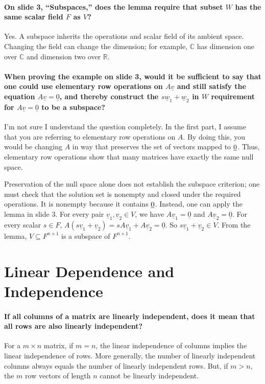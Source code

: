 \documentclass[10pt,english]{article}
\begin{document}
\paragraph{On slide 3, ``Subspaces,'' does the lemma require that subset $W$ has the same scalar field $F$ as $V$?}
Yes. A subspace inherits the operations and scalar field of its ambient space. Changing the field can change the dimension; for example, $\mathbb{C}$ has dimension one over $\mathbb{C}$ and dimension two over $\mathbb{R}$.


\paragraph{When proving the example on slide 3, would it be sufficient to say that one could use elementary row operations on $A\underline{v}$ and still satisfy the equation $A\underline{v}=\underline{0}$, and thereby construct the $s\underline{w}_1 + \underline{w}_2$ in $W$ requirement for $A\underline{v}=\underline{0}$ to be a subspace?}
I'm not sure I understand the question completely.
In the first part, I assume that you are referring to elementary row operations on $A$.
By doing this, you would be changing $A$ in way that preserves the set of vectors mapped to $\underline{0}$.
Thus, elementary row operations  show that many matrices have exactly the same null space.

Preservation of the null space alone does not establish the subspace criterion; one must check that the solution set is nonempty and closed under the required operations. It is nonempty because it contains $\underline{0}$.
Instead, one can apply the lemma in slide 3.
For every pair $\underline{v}_1, \underline{v}_2 \in V$, we have $A\underline{v}_1=\underline{0}$ and $A\underline{v}_2=\underline{0}$. For every scalar $s\in F$, $A(s\underline{v}_1+\underline{v}_2) = sA\underline{v}_1 + A\underline{v}_2 = \underline{0}$. So $s\underline{v}_1+\underline{v}_2 \in V$. From the lemma, $V\subseteq F^{n \times 1}$ is a subspace of $F^{n \times 1}$.

\section{Linear Dependence and Independence}

\paragraph{If all columns of a matrix are linearly independent, does it mean that all rows are also linearly independent?}
For a $m\times n$ matrix, if $m=n$, the linear independence of columns implies the linear independence of rows.
More generally, the number of linearly independent columns always equals the number of linearly independent rows.
But, if $m>n$, the $m$ row vectors of length $n$ cannot be linearly independent.
\end{document}
